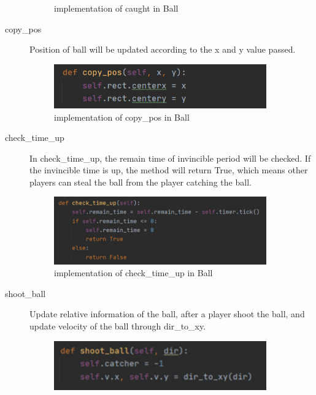 \documentclass[14pt]{extarticle}
\begin{document}
\begin{description}
\begin{figure}[H]
\begin{center}
			\caption{implementation of caught in Ball}
		\end{center}
	\end{figure}
	\item[copy\_pos]
	Position of ball will be updated according to the x and y value passed.
	\begin{figure}[H]
		\begin{center}
			\includegraphics[width=0.9\textwidth]{Ball_copy_pos}
			\caption{implementation of copy\_pos in Ball}
		\end{center}
	\end{figure}
	\item[check\_time\_up]
	In check\_time\_up, the remain time of invincible period will be checked. If the invincible time is up, the method will return True, which means other players can steal the ball from the player catching the ball.
	\begin{figure}[H]
		\begin{center}
			\includegraphics[width=0.9\textwidth]{Ball_check_time}
			\caption{implementation of check\_time\_up in Ball}
		\end{center}
	\end{figure}
	\item[shoot\_ball]
	Update relative information of the ball, after a player shoot the ball, and update velocity of the ball through dir\_to\_xy.
	\begin{figure}[H]
		\begin{center}
			\includegraphics[width=0.9\textwidth]{Ball_shoot}

\end{center}
\end{figure}
\end{description}
\end{document}

